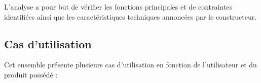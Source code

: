 \documentclass{rapportENS}
\begin{document}
L'analyse a pour but de vérifier les fonctions principales et de contraintes identifiées ainsi que les caractéristiques techniques annoncées par le constructeur. 
 
 
 
 

\subsection{Cas d'utilisation}

Cet ensemble présente plusieurs cas d'utilisation en fonction de l'utilisateur et du produit possédé : 
\vspace{0.1cm}
\end{document}
